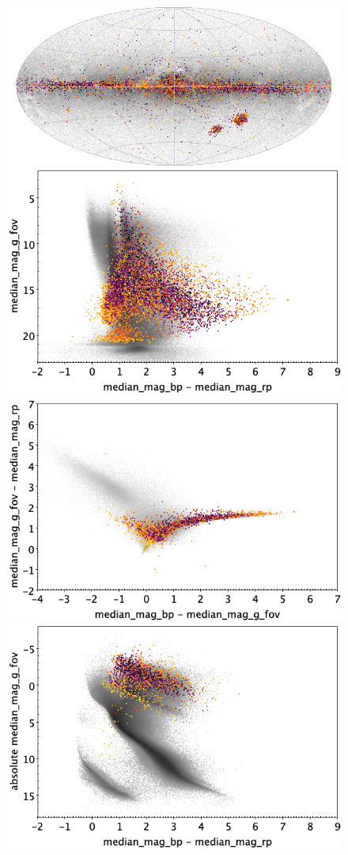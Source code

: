 \documentclass[longauth]{aa}
\begin{document}
\begin{appendix}
\begin{figure}
\centering
{}
\includegraphics[width=0.6\hsize]{figures/appendix/CEP_cls_sky.png} 
 \\ %
\vspace{4mm}
 \includegraphics[width=0.45\hsize]{figures/appendix/CEP_cls_cm.png}  %
\hspace{2mm}
 \includegraphics[width=0.45\hsize]{figures/appendix/CEP_cls_cc.png} \\ %
\vspace{4mm}
 \includegraphics[width=0.45\hsize]{figures/appendix/CEP_cls_cam.png}  %

\end{figure}
\end{appendix}
\end{document}
